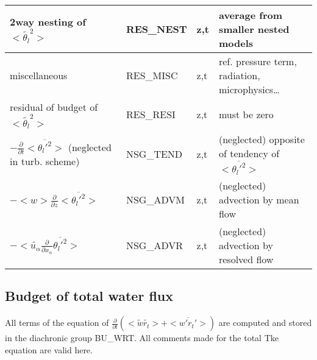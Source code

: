 \begin{longtable}[c]{|p{}|p{}|p{}|p{}|}
{\rm 2way nesting of }$<\tilde{\theta_l}^2>$                             & RES\_NEST  & z,t & average from smaller nested models \\\hline
{\rm miscellaneous}                                                      & RES\_MISC  & z,t & ref. pressure term, radiation, microphysics\ldots \\\hline
{\rm residual of budget of} $<\tilde{\theta_l}^2>$                       & RES\_RESI  & z,t & must be zero \\\hline
$-\frac{\partial }{\partial t}<\overline{\theta_l'^2}>$ (neglected in turb. scheme)& NSG\_TEND & z,t & (neglected) opposite of tendency of $<\overline{\theta_l'^2}>$ \\\hline
$-<w>\frac{\partial}{\partial z}<\overline{\theta_l'^2}>$                & NSG\_ADVM  & z,t & (neglected) advection by mean flow \\\hline
$-<\tilde{u_\alpha}\frac{\partial}{\partial x_\alpha}\overline{\theta_l'^2}>$ & NSG\_ADVR & z,t & (neglected) advection by resolved flow \\\hline
\end{longtable}



\subsection{Budget of total water flux}

All terms of the equation of $\frac{\partial}{\partial t} (<\tilde{w}\tilde{r_t}> + <\overline{w'r_t'}>)$ are
computed and stored in the diachronic group BU\_WRT. 
All comments made for the total Tke equation are valid here.\\

